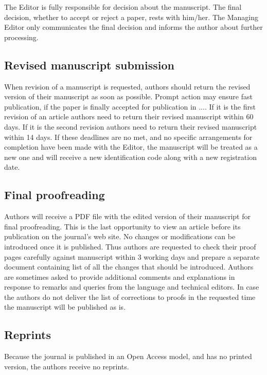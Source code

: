 \documentclass[USenglish,oneside,twocolumn]{article}
\begin{document}
The Editor is fully responsible for decision about the manuscript. The final decision, whether to accept or reject a paper, rests with him/her. The Managing Editor only communicates the final decision and informs the author about further processing.

\subsection{Revised manuscript submission}

When revision of a manuscript is requested, authors should return the revised version of their manuscript as soon as possible. Prompt action may ensure fast publication, if the paper is finally accepted for publication in .... If it is the first revision of an article authors need to return their revised manuscript within 60 days. If it is the second revision authors need to return their revised manuscript within 14 days. If these deadlines are no met, and no specific arrangements for completion have been made with the Editor, the manuscript will be treated as a new one and will receive a new identification code along with a new registration date.

\subsection{Final proofreading}

Authors will receive a PDF file with the edited version of their manuscript for final proofreading. This is the last opportunity to view an article before its publication on the journal's web site. No changes or modifications can be introduced once it is published. Thus authors are requested to check their proof pages carefully against manuscript within 3 working days and prepare a separate document containing list of all the changes that should be introduced. Authors are sometimes asked to provide additional comments and explanations in response to remarks and queries from the language and technical editors. In case the authors do not deliver the list of corrections to proofs in the requested time the manuscript will be published as is.

 

\subsection{Reprints}

Because the journal is published in an Open Access model, and has no printed version, the authors receive no reprints.
\end{document}
